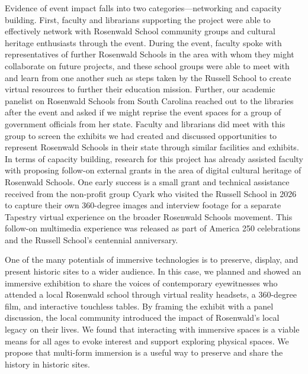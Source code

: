 \documentclass[final]{anthology-ch}  %
\begin{document}
Evidence of event impact falls into two categories---networking and capacity building. First, faculty and librarians supporting the project were able to effectively network with Rosenwald School community groups and cultural heritage enthusiasts through the event. During the event, faculty spoke with representatives of further Rosenwald Schools in the area with whom they might collaborate on future projects, and these school groups were able to meet with and learn from one another such as steps taken by the Russell School to create virtual resources to further their education mission. Further, our academic panelist on Rosenwald Schools from South Carolina reached out to the libraries after the event and asked if we might reprise the event spaces for a group of government officials from her state. Faculty and librarians did meet with this group to screen the exhibits we had created and discussed opportunities to represent Rosenwald Schools in their state through similar facilities and exhibits. In terms of capacity building, research for this project has already assisted faculty with proposing follow-on external grants in the area of digital cultural heritage of Rosenwald Schools. One early success is a small grant and technical assistance received from the non-profit group Cyark who visited the Russell School in 2026 to capture their own 360-degree images and interview footage for a separate Tapestry virtual experience on the broader Rosenwald Schools movement. This follow-on multimedia experience was released as part of America 250 celebrations and the Russell School's centennial anniversary.

One of the many potentials of immersive technologies is to preserve, display, and present historic sites to a wider audience. In this case, we planned and showed an immersive exhibition to share the voices of contemporary eyewitnesses who attended a local Rosenwald school through virtual reality headsets, a 360-degree film, and interactive touchless tables. By framing the exhibit with a panel discussion, the local community introduced the impact of Rosenwald's local legacy on their lives. We found that interacting with immersive spaces is a viable means for all ages to evoke interest and support exploring physical spaces. We propose that multi-form immersion is a useful way to preserve and share the history in historic sites.

\printbibliography
\end{document}
